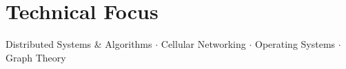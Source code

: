 
\section{Technical Focus}
Distributed Systems \& Algorithms $\cdot$ Cellular Networking $\cdot$ Operating Systems $\cdot$ Graph Theory


